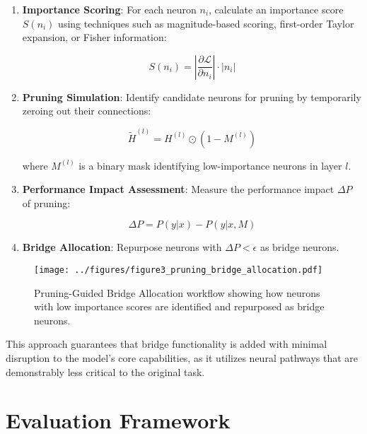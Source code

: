 \documentclass[9pt,a4paper,twocolumn,twoside]{tau-class/tau}
\begin{document}
    \begin{enumerate}
        \item \textbf{Importance Scoring}: For each neuron $n_i$, calculate an importance score $S(n_i)$ using techniques such as magnitude-based scoring, first-order Taylor expansion, or Fisher information:

        \begin{equation}
            S(n_i) = \left|\frac{\partial \mathcal{L}}{\partial n_i}\right| \cdot |n_i|
        \end{equation}

        \item \textbf{Pruning Simulation}: Identify candidate neurons for pruning by temporarily zeroing out their connections:

        \begin{equation}
            \tilde{H}^{(l)} = H^{(l)} \odot (1 - M^{(l)})
        \end{equation}

        where $M^{(l)}$ is a binary mask identifying low-importance neurons in layer $l$.

        \item \textbf{Performance Impact Assessment}: Measure the performance impact $\Delta P$ of pruning:

        \begin{equation}
            \Delta P = P(y|x) - P(y|x, M)
        \end{equation}

        \item \textbf{Bridge Allocation}: Repurpose neurons with $\Delta P < \epsilon$ as bridge neurons.
    \end{enumerate}

    \begin{figure}[h]
        \centering
        \texttt{[image: ../figures/figure3\_pruning\_bridge\_allocation.pdf]}
        \caption{Pruning-Guided Bridge Allocation workflow showing how neurons with low importance scores are identified and repurposed as bridge neurons.}
        \label{fig:pgba}
    \end{figure}

    This approach guarantees that bridge functionality is added with minimal disruption to the model's core capabilities, as it utilizes neural pathways that are demonstrably less critical to the original task.

\section{Evaluation Framework}
\end{document}
